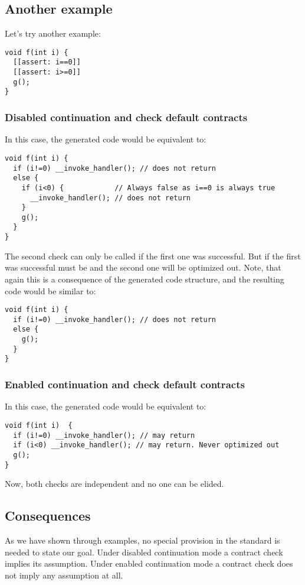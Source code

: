 \subsection{Another example}

Let's try another example:

\begin{lstlisting}
void f(int i) {
  [[assert: i==0]]
  [[assert: i>=0]]
  g();
}
\end{lstlisting}

\subsubsection{Disabled continuation and check default contracts}

In this case, the generated code would be equivalent to:

\begin{lstlisting}
void f(int i) {
  if (i!=0) __invoke_handler(); // does not return
  else {
    if (i<0) {            // Always false as i==0 is always true
      __invoke_handler(); // does not return
    }
    g();
  }
}
\end{lstlisting}

The second check can only be called if the first one was successful.
But if the first was successful  must be  and the second
one will be optimized out. Note, that again this is a consequence of the 
generated code structure, and the resulting code would be similar to:

\begin{lstlisting}
void f(int i) {
  if (i!=0) __invoke_handler(); // does not return
  else {
    g();
  }
}
\end{lstlisting}


\subsubsection{Enabled continuation and check default contracts}

In this case, the generated code would be equivalent to:

\begin{lstlisting}
void f(int i)  {
  if (i!=0) __invoke_handler(); // may return
  if (i<0) __invoke_handler(); // may return. Never optimized out
  g();
}
\end{lstlisting}

Now, both checks are independent and no one can be elided.

\subsection{Consequences}

As we have shown through examples, no special provision in the standard is
needed to state our goal. Under disabled continuation mode a contract check implies
its assumption. Under enabled continuation mode a contract check does not imply
any assumption at all.
